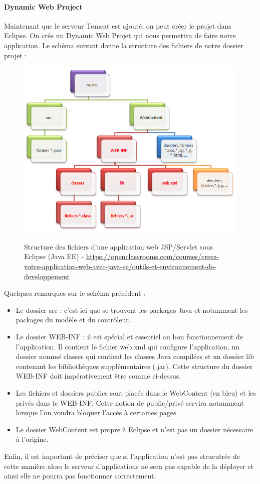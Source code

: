 \paragraph{Dynamic Web Project}
Maintenant que le serveur Tomcat est ajouté, on peut créer le projet dans Eclipse. On crée un Dynamic Web Projet qui nous permettra de faire notre application.
Le schéma suivant donne la structure des fichiers de notre dossier projet :\\
\begin{figure}[H]
  \center
  \includegraphics[scale=0.5]{../graph/schemaProjetDynamic.png} \\
  \caption{Structure des fichiers d'une application web JSP/Servlet sous Eclipse (Java EE) - \url{https://openclassrooms.com/courses/creez-votre-application-web-avec-java-ee/outils-et-environnement-de-developpement}}
\end{figure}
Quelques remarques sur le schéma précédent :
\begin{itemize}
 \item Le dossier src : c'est ici que se trouvent les packages Java et notamment les packages du modèle et du contrôleur.
 \item Le dossier WEB-INF : il est spécial et essentiel au bon fonctionnement de l'application. Il contient le fichier web.xml qui configure l'application, un dossier nommé classes qui contient les classes Java compilées et un dossier lib contenant les bibliothèques supplémentaires (.jar). Cette structure du dossier WEB-INF doit impérativement être comme ci-dessus.
 \item Les fichiers et dossiers publics sont placés dans le WebContent (en bleu) et les privés dans le WEB-INF. Cette notion de public/privé servira notamment lorsque l'on voudra bloquer l'accès à certaines pages.
 \item Le dossier WebContent est propre à Eclipse et n'est pas un dossier nécessaire à l'origine.
\end{itemize}
Enfin, il est important de préciser que si l'application n'est pas strucutrée de cette manière alors le serveur d'applications ne sera pas capable de la déployer et ainsi elle ne pourra pas fonctionner correctement.\\


